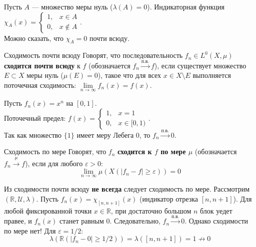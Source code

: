 \documentclass[12pt,a4paper]{article}
\begin{document}
\begin{Example}
Пусть $A$ — множество меры нуль ($\lambda(A) = 0$). Индикаторная функция $\chi_A(x) = \begin{cases} 1, & x \in A \\ 0, & x \notin A \end{cases}$. \\
Можно сказать, что $\chi_A = 0$ почти всюду.
\end{Example}

\begin{Definition}{Сходимость почти всюду}{}
Говорят, что последовательность $f_n \in L^0(X, \mu)$ \textbf{сходится почти всюду} к $f$ (обозначается $f_n \xrightarrow{\text{п.в.}} f$), если существует множество $E \subset X$ меры нуль ($\mu(E) = 0$), такое что для всех $x \in X \setminus E$ выполняется поточечная сходимость: $\lim\limits_{n \to \infty} f_n(x) = f(x)$.
\end{Definition}

\begin{Example}
Пусть $f_n(x) = x^n$ на $[0, 1]$. \\
Поточечный предел: $f(x) = \begin{cases} 1, & x = 1 \\ 0, & x \in [0, 1) \end{cases}$. \\
Так как множество $\{1\}$ имеет меру Лебега 0, то $f_n \xrightarrow{\text{п.в.}} 0$.
\end{Example}

\begin{Definition}{Сходимость по мере}{}
Говорят, что $f_n$ \textbf{сходится к $f$ по мере $\mu$} (обозначается $f_n \xrightarrow{\mu} f$), если для любого $\varepsilon > 0$:
$$ \lim\limits_{n \to \infty} \mu(X(|f_n - f| \ge \varepsilon)) = 0 $$
\end{Definition}

\begin{Example}[ Контрпример ]
Из сходимости почти всюду \textbf{не всегда} следует сходимость по мере.
Рассмотрим $(\mathbb{R}, \mathcal{U}, \lambda)$. Пусть $f_n(x) = \chi_{[n, n+1]}(x)$ (индикатор отрезка $[n, n+1]$).
Для любой фиксированной точки $x \in \mathbb{R}$, при достаточно большом $n$ блок уедет правее, и $f_n(x)$ станет равным 0. Следовательно, $f_n \xrightarrow{\text{п.в.}} 0$.
Однако сходимости по мере нет! Для $\varepsilon = 1/2$:
$$ \lambda(\mathbb{R}(|f_n - 0| \ge 1/2)) = \lambda([n, n+1]) = 1 \not\to 0 $$
\end{Example}
\end{document}
